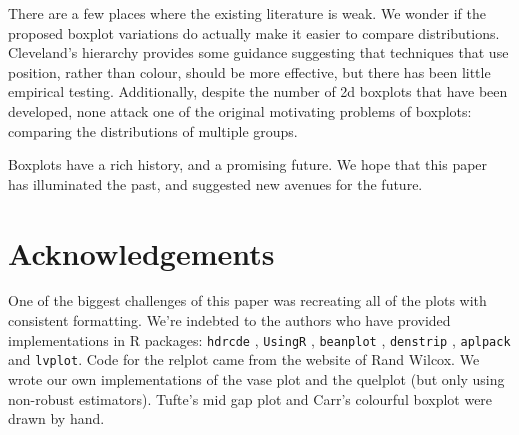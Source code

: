\documentclass[oneside]{article}
\begin{document}
There are a few places where the existing literature is weak. We wonder if the proposed boxplot variations do actually make it easier to compare distributions. Cleveland's hierarchy \citep{cleveland:1984} provides some guidance suggesting that techniques that use position, rather than colour, should be more effective, but there has been little empirical testing. Additionally, despite the number of 2d boxplots that have been developed, none attack one of the original motivating problems of boxplots: comparing the distributions of multiple groups.

Boxplots have a rich history, and a promising future. We hope that this paper has illuminated the past, and suggested new avenues for the future.

\section{Acknowledgements}
\label{sec:acknowledgements}

One of the biggest challenges of this paper was recreating all of the plots with consistent formatting. We're indebted to the authors who have provided implementations in R packages: {\tt hdrcde} \citep{hdrcde}, {\tt UsingR} \citep{UsingR}, {\tt beanplot} \citep{kampstra:2008}, {\tt denstrip} \citep{jackson:2008}, {\tt aplpack} \citep{aplpack} and {\tt lvplot}. Code for the relplot came from the website of Rand Wilcox. We wrote our own implementations of the vase plot and the quelplot (but only using non-robust estimators). Tufte's mid gap plot and Carr's colourful boxplot were drawn by hand.


\end{document}
